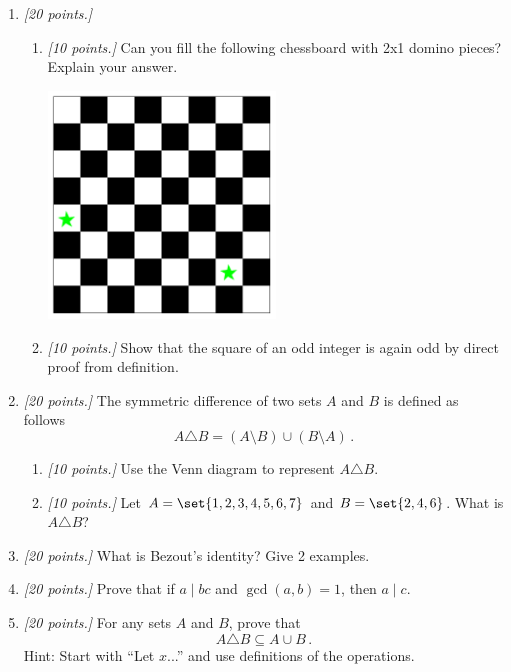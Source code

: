 \documentclass[12pt]{amsart}
\begin{document}
\begin{enumerate}[label=\arabic*.,itemsep=10pt, leftmargin=*]
	\item\textit{[20 points.]}
	\begin{enumerate}
		\item \textit{[10 points.]}
		      Can you fill the following chessboard with 2x1 domino pieces? Explain your answer.
		      \begin{center}
			      \includegraphics[width=0.5\textwidth]{Checker1.pdf}
		      \end{center}
		      \vspace{5cm}

		\item \textit{[10 points.]}
		      Show that the square of an odd integer is again odd by direct proof
		      from definition.


	\end{enumerate}
	\newpage
	\item\textit{[20 points.]}
	The symmetric difference of two sets $A$ and $B$ is defined as follows
	\begin{equation*}
		A \triangle B = (A\setminus B) \cup (B\setminus A) \,.
	\end{equation*}
	\begin{enumerate}
		\item \textit{[10 points.]}
		      Use the Venn diagram to represent $A \triangle B$.
		\item \textit{[10 points.]}
		      Let $A = \set{1,2,3,4,5,6,7}$ and $B = \set{2,4,6}$. What is $A\triangle B$?
	\end{enumerate}
	\newpage


	\item\textit{[20 points.]}
	What is Bezout's identity? Give 2 examples.

	\newpage

	\item \textit{[20 points.]} Prove that if $a \mid bc$ and $\gcd(a,b) = 1$, then $a \mid c$.

	      \newpage

	\item \textit{[20 points.]} For any sets $A$ and $B$, prove that
	      \begin{equation*}
		      A \triangle B \subseteq A \cup B \,.
	      \end{equation*}
	      Hint: Start with ``Let $x$...'' and use definitions of the operations.

\end{enumerate}



\printbibliography
%
%
\end{document}
